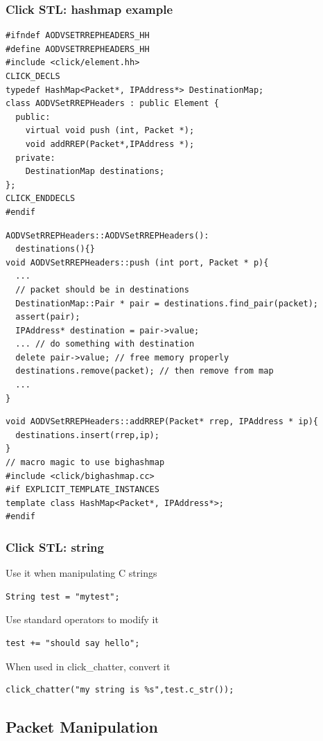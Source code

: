 \documentclass{beamer}
\begin{document}
\begin{frame}
\frametitle{Click STL: hashmap example}
\begin{lstlisting}[basicstyle=\footnotesize]
#ifndef AODVSETRREPHEADERS_HH
#define AODVSETRREPHEADERS_HH
#include <click/element.hh>
CLICK_DECLS
typedef HashMap<Packet*, IPAddress*> DestinationMap;
class AODVSetRREPHeaders : public Element { 
  public:
    virtual void push (int, Packet *);
    void addRREP(Packet*,IPAddress *);
  private:
    DestinationMap destinations;
};
CLICK_ENDDECLS
#endif
\end{lstlisting}
\begin{lstlisting}[basicstyle=\footnotesize]
AODVSetRREPHeaders::AODVSetRREPHeaders(): 
  destinations(){}
void AODVSetRREPHeaders::push (int port, Packet * p){
  ...
  // packet should be in destinations
  DestinationMap::Pair * pair = destinations.find_pair(packet);
  assert(pair);
  IPAddress* destination = pair->value;
  ... // do something with destination
  delete pair->value; // free memory properly
  destinations.remove(packet); // then remove from map
  ...
}
\end{lstlisting}
\begin{lstlisting}[basicstyle=\footnotesize]
void AODVSetRREPHeaders::addRREP(Packet* rrep, IPAddress * ip){
  destinations.insert(rrep,ip);
}
// macro magic to use bighashmap
#include <click/bighashmap.cc>
#if EXPLICIT_TEMPLATE_INSTANCES
template class HashMap<Packet*, IPAddress*>;
#endif
\end{lstlisting}
\end{frame}

\begin{frame}[fragile]
\frametitle{Click STL: string}
Use it when manipulating C strings
\begin{lstlisting}[basicstyle=\footnotesize]
String test = "mytest";
\end{lstlisting}
Use standard operators to modify it
\begin{lstlisting}[basicstyle=\footnotesize]
test += "should say hello";
\end{lstlisting}
When used in click\_chatter, convert it
\begin{lstlisting}[basicstyle=\footnotesize]
click_chatter("my string is %s",test.c_str());
\end{lstlisting}
\end{frame}

\subsection{Packet Manipulation} %
\label{sub:packet_manipulation}
\end{document}
